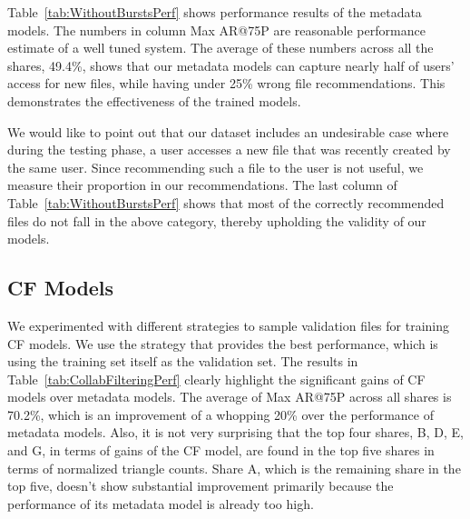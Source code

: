Table~\ref{tab:WithoutBurstsPerf} shows performance results of the
metadata models.  The numbers in column Max AR@75P are reasonable
performance estimate of a well tuned system.  The average of these
numbers across all the shares, 49.4\%, shows that our metadata models 
can capture nearly half of users' access for new files, while having under 25\% 
wrong file recommendations. This demonstrates the effectiveness of the 
trained models. 

We would like to point out that our dataset includes an undesirable
case where during the testing phase, a user accesses a new file that 
was recently created by the same user. Since recommending such a file to the
user is not useful, we measure their proportion in our recommendations. 
The last column of Table~\ref{tab:WithoutBurstsPerf} shows that 
most of the correctly recommended files do not fall in the above category, 
thereby upholding the validity of our models.


\subsection{CF Models} 
We experimented with different strategies to sample validation files
for training CF models.  We use the strategy that provides the best
performance, which is using the training set itself as the validation
set.  The results in Table~\ref{tab:CollabFilteringPerf} clearly
highlight the significant gains of CF models over metadata models.
The average of Max AR@75P across all shares is 70.2\%, which is an
improvement of a whopping 20\% over the performance of metadata models.
Also, it is not very surprising that the top four shares, B, D, E, and
G, in terms of gains of the CF model, are found in the top five shares in
terms of normalized triangle counts.  Share A, which is the remaining
share in the top five, doesn't show substantial improvement primarily
because the performance of its metadata model is already too high.

